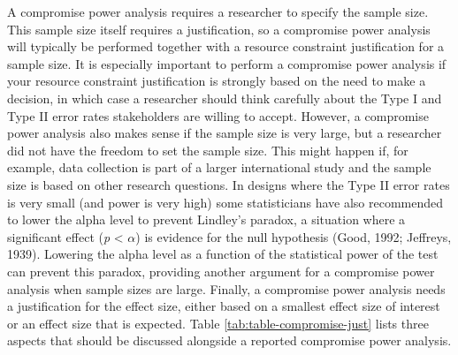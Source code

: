 \documentclass[
  english,
  ,jou, a4paper,floatsintext]{apa6}
\begin{document}
A compromise power analysis requires a researcher to specify the sample size. This sample size itself requires a justification, so a compromise power analysis will typically be performed together with a resource constraint justification for a sample size. It is especially important to perform a compromise power analysis if your resource constraint justification is strongly based on the need to make a decision, in which case a researcher should think carefully about the Type I and Type II error rates stakeholders are willing to accept. However, a compromise power analysis also makes sense if the sample size is very large, but a researcher did not have the freedom to set the sample size. This might happen if, for example, data collection is part of a larger international study and the sample size is based on other research questions. In designs where the Type II error rates is very small (and power is very high) some statisticians have also recommended to lower the alpha level to prevent Lindley's paradox, a situation where a significant effect (\emph{p} \textless{} \(\alpha\)) is evidence for the null hypothesis (Good, 1992; Jeffreys, 1939). Lowering the alpha level as a function of the statistical power of the test can prevent this paradox, providing another argument for a compromise power analysis when sample sizes are large. Finally, a compromise power analysis needs a justification for the effect size, either based on a smallest effect size of interest or an effect size that is expected. Table \ref{tab:table-compromise-just} lists three aspects that should be discussed alongside a reported compromise power analysis.
\end{document}
